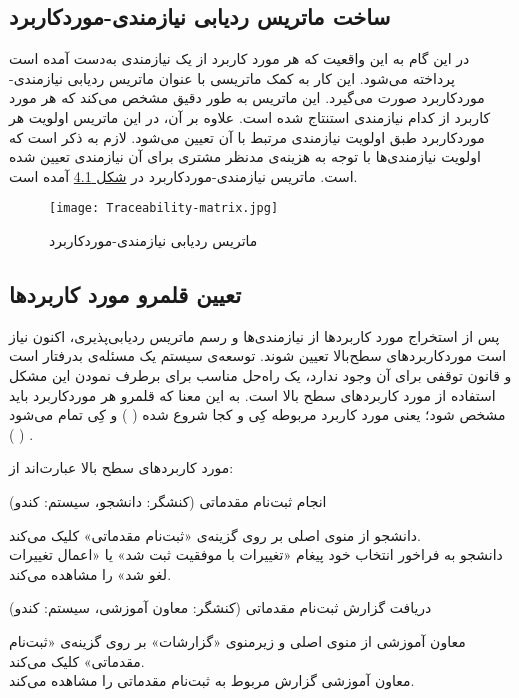 \documentclass{report}
\begin{document}
\subsection{ ساخت ماتریس ردیابی نیازمندی-موردکاربرد}
در این گام به این واقعیت که هر مورد کاربرد از یک نیازمندی به‌دست آمده است پرداخته می‌شود. این کار به کمک ماتریسی با عنوان ماتریس ردیابی نیازمندی-موردکاربرد
صورت می‌گیرد. این ماتریس به طور دقیق مشخص می‌کند که هر مورد کاربرد از کدام نیازمندی استنتاج شده است. علاوه بر آن، در این ماتریس اولویت هر موردکاربرد طبق اولویت نیازمندی مرتبط با آن تعیین می‌شود. لازم به ذکر است که اولویت نیازمندی‌ها با توجه به هزینه‌ی مدنظر مشتری برای آن نیازمندی تعیین شده است.
ماتریس نیازمندی-موردکاربرد در 
\hyperlink{one}{شکل 4.1}
آمده است.
\hypertarget{one}{
\begin{figure}[!h]
\texttt{[image: Traceability-matrix.jpg]}
\caption{ماتریس ردیابی نیازمندی-موردکاربرد}
\end{figure} }
\clearpage
\restoregeometry
\subsection{تعیین قلمرو مورد کاربردها}
پس از استخراج مورد کاربردها از نیازمندی‌ها و رسم ماتریس ردیابی‌پذیری، اکنون نیاز است ﻣﻮردﮐﺎرﺑﺮدهای ﺳﻄﺢﺑﺎﻻ تعیین شوند. توسعه‌ی سیستم یک مسئله‌ی بدرفتار است و قانون توقفی برای آن وجود ندارد، یک راه‌حل مناسب برای برطرف نمودن این مشکل استفاده از مورد کاربردهای سطح بالا است. به این معنا که قلمرو هر ﻣﻮردﮐﺎرﺑﺮد باید ﻣﺸﺨﺺ شود؛ یعنی مورد کاربرد مربوطه کِی  و کجا شروع شده (
)
 و کِی  تمام می‌شود (
) .

 مورد کاربردهای سطح بالا عبارت‌اند از:
 
\textbf{}
 انجام ثبت‌نام مقدماتی (کنشگر: دانشجو، سیستم: کندو)
\begin{addmargin}[.84cm]{0cm}
 دانشجو از منوی اصلی بر روی گزینه‌ی «ثبت‌نام مقدماتی» کلیک می‌کند.\\
دانشجو به فراخور انتخاب خود پیغام‌ «تغییرات با موفقیت ثبت شد» یا «اعمال تغییرات لغو شد» را مشاهده می‌کند.

\end{addmargin}

\textbf{}
دریافت گزارش ثبت‌نام مقدماتی (کنشگر: معاون آموزشی، سیستم: کندو)
\begin{addmargin}[.84cm]{0cm}
معاون آموزشی از منوی اصلی و زیرمنوی «گزارشات» بر روی گزینه‌ی «ثبت‌نام مقدماتی» کلیک می‌کند.\\
معاون آموزشی گزارش مربوط به ثبت‌نام مقدماتی را مشاهده می‌کند.
\end{addmargin}
\end{document}
